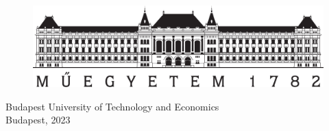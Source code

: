 

\frenchspacing
\thispagestyle{empty} %

\begin{center}
   \Large{\Course} \\
   \vskip 0.25cm
   \large{\CourseNeptun}
   \vskip 2cm
\end{center}

\begin{center}
   \Huge{\textbf{\Title}}
   \vskip 3cm
   \Large{\Name}\\
\end{center}

\begin{center}
   \mbox{}
   \vfill

   \begin{figure}[htb]
      \centering
      \includegraphics[width=0.35\linewidth]{figures/bme-logo.jpg}
   \end{figure}

   \large{Budapest University of Technology and Economics} \\
   \large{Budapest, 2023}

   \pagebreak
   \setcounter{page}{1}
\end{center}
